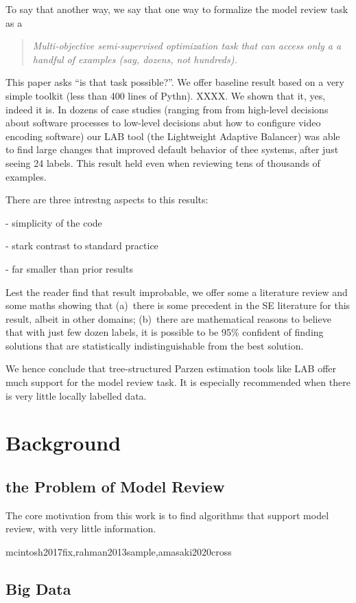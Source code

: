 To say that another way, we say that one way to formalize the
model review task  as a  \begin{quote} {\em Multi-objective  semi-supervised optimization task that can access only a  a handful of examples
(say, dozens, not hundreds). }
\end{quote}
This paper asks ``is that task  possible?''. We offer  baseline result
based on a very simple toolkit (less than 400 lines of Pythn). XXXX. We shown that it, yes, indeed it is. 
In dozens of case studies (ranging from
from high-level decisions about software processes to low-level decisions abut how to
configure video encoding software) our LAB tool
(the Lightweight Adaptive Balancer) 
  was able to find large changes that improved
  default behavior of thee systems, after just seeing 24 labels.
  This result held even when reviewing tens of thousands of examples. 
  
  There are three intrestng aspects to this results:
  
- simplicity of the code

- stark contrast to standard practice


- far smaller than prior results
  
  Lest the reader find that result improbable, we offer some a literature review and some maths showing that (a)~there is some precedent in the SE literature for this result, albeit in other domains;
  (b)~there are mathematical reasons to believe that with just  few dozen labels, it is possible to be 95\% confident of finding solutions
  that are statistically indistinguishable from the best solution.  

  
  We hence conclude that tree-structured Parzen estimation
  tools like LAB offer much support for the model  review task. It is especially recommended when there is very little locally labelled data. 

\section{Background}
\subsection{the Problem of Model Review}
The core motivation from this work is to find algorithms that support model review, with very little information.  
 
 
mcintosh2017fix,rahman2013sample,amasaki2020cross

\subsection{Big Data}
  
